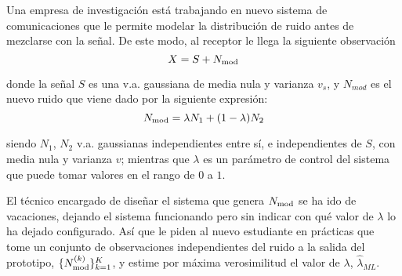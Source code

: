 \ifspanish

\question[25]  %

Una empresa de investigación está trabajando en nuevo sistema de comunicaciones que le permite modelar la distribución de ruido antes de mezclarse con la señal. De este modo, al receptor le llega la siguiente observación
$$ X= S+N_{\rm mod}$$

donde la señal $S$ es una v.a. gaussiana de media nula y varianza $v_s$, y $N_{mod}$ es el nuevo ruido que viene dado por la siguiente expresión:
$$N_{\rm mod} = \lambda  N_1 + (1-\lambda) N_2$$

siendo $N_1$, $N_2$  v.a. gaussianas independientes entre sí, e independientes de $S$, con media nula y varianza $v$; mientras que  $\lambda$ es un parámetro de control del sistema que puede tomar valores en el rango de $0$ a $1$.


El técnico encargado de diseñar el sistema que genera $N_{\rm mod}$ se ha ido de vacaciones, dejando el sistema funcionando pero sin indicar con qué valor de $\lambda$ lo ha dejado configurado. Así que le piden al nuevo estudiante en prácticas que tome un conjunto de observaciones independientes del ruido a la salida del prototipo, $\{N_{\rm mod}^{(k)}\}_{k=1}^K$, y estime por máxima verosimilitud el valor de $\lambda$, $\hat{\lambda}_{ML}$.

